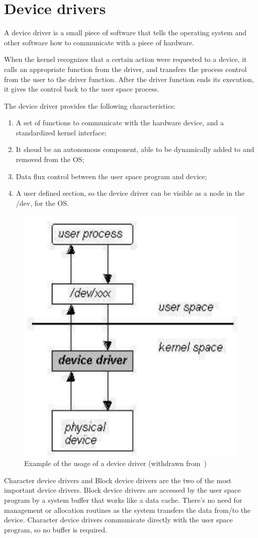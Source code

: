 %
\section{Device drivers}
\label{sec:device-drivers}

A device driver is a small piece of software that tells the operating system and other software how to communicate with a piece of hardware.~\cite{ddrivers}

When the kernel recognizes that a certain action were requested to a device, it calls an appropriate function from the driver, and transfers the process control from the user to the driver function.
After the driver function ends its execution, it gives the
control back to the user space process.

The device driver provides the following characteristics:

\begin{enumerate}[label=\roman*.]
\item A set of functions to communicate with the hardware
device, and a standardized kernel interface; 
\item It shoud be an autonomous component, able to be
dynamically added to and removed from the OS;
\item Data flux control between the user space program and
device;
\item A user defined section, so the device driver can be
visible as a node in the /dev, for the OS.
\end{enumerate}

\begin{figure}[htb!]
\centering
    \includegraphics[width=0.35\columnwidth]{./img/ddrivers-char.png}
  \caption{Example of the usage of a device driver (withdrawn from~\cite{ddrivers-slides})}%
\label{fig:ddrivers-char}
\end{figure}

Character device drivers and Block device drivers are the two of the most important device drivers.
Block device drivers are accessed by the user space program by a system buffer that works like a data cache. There's no need for management or allocation routines as the system transfers the data from/to the device.
Character device drivers communicate directly with the user space program, so no buffer is required.~\cite{ddrivers-slides}


